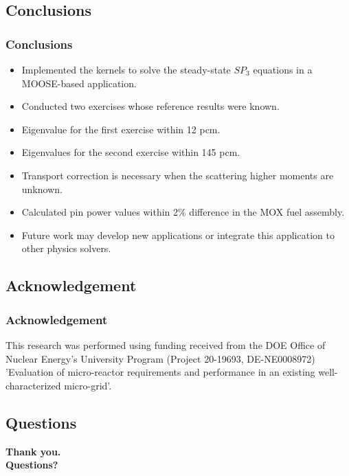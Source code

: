 \subsection{Conclusions}

\begin{frame}
\frametitle{Conclusions}

	\begin{itemize}
        \item Implemented the kernels to solve the steady-state $SP_3$ equations in a MOOSE-based application.
        \item Conducted two exercises whose reference results were known.
		\item Eigenvalue for the first exercise within 12 pcm.
		\item Eigenvalues for the second exercise within 145 pcm.
		\item Transport correction is necessary when the scattering higher moments are unknown.
		\item Calculated pin power values within 2\% difference in the MOX fuel assembly.
        \item Future work may develop new applications or integrate this application to other physics solvers.
    \end{itemize}
\end{frame}


\subsection{Acknowledgement}

\begin{frame}
\frametitle{Acknowledgement}

This research was performed using funding received from the DOE Office of Nuclear Energy’s University Program (Project 20-19693, DE-NE0008972) ’Evaluation of micro-reactor requirements and performance in an existing well-characterized micro-grid’.

\end{frame}


\subsection{Questions}

\begin{frame}
  \begin{center}
    \Huge{\textbf{Thank you.\\ Questions?}}
  \end{center}
\end{frame}
